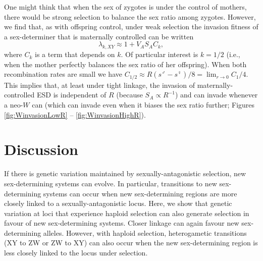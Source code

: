 \documentclass[12pt]{article}
\begin{document}
One might think that when the sex of zygotes is under the control of mothers, there would be strong selection to balance the sex ratio among zygotes. 
However, we find that, as with offspring control, under weak selection the invasion fitness of a sex-determiner that is maternally controlled can be written
\begin{equation}
\lambda_{k,XY} \approx 1 + V_A S_A C_k,
\end{equation}
where
$C_k$ is a term that depends on $k$.
%
%
%
%
Of particular interest is $k=1/2$ (i.e., when the mother perfectly balances the sex ratio of her offspring).
When both recombination rates are small we have $C_{1/2} \approx R(s^\male - s^\female)/8 = \lim_{r \rightarrow 0} C_1/4$.
This implies that, at least under tight linkage, the invasion of maternally-controlled ESD is independent of $R$ (because $S_A\propto R^{-1}$) and can invade whenever a neo-$W$ can (which can invade even when it biases the sex ratio further; Figures \ref{fig:WinvasionLowR} -- \ref{fig:WinvasionHighR}).

\section*{Discussion}

If there is genetic variation maintained by sexually-antagonistic selection, new sex-determining systems can evolve. 
In particular, transitions to new sex-determining systems can occur when new sex-determining regions are more closely linked to a sexually-antagonistic locus.
Here, we show that genetic variation at loci that experience haploid selection can also generate selection in favour of new sex-determining systems. 
Closer linkage can again favour new sex-determining alleles. 
However, with haploid selection, heterogametic transitions (XY to ZW or ZW to XY) can also occur when the new sex-determining region is less closely linked to the locus under selection. 
\end{document}
